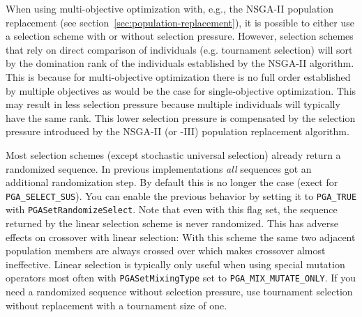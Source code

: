 \documentclass{report}
\begin{document}
When using multi-objective optimization with, e.g., the NSGA-II \cite{DPAM02}
population replacement (see section~\ref{sec:population-replacement}),
it is possible to either use a selection scheme with or without
selection pressure. However, selection schemes that rely on direct
comparison of individuals (e.g. tournament selection) will sort by the
domination rank of the individuals established by the NSGA-II algorithm.
This is because for multi-objective optimization there is no full order
established by multiple objectives as would be the case for
single-objective optimization. This may result in less selection
pressure because multiple individuals will typically have the same rank.
This lower selection pressure is compensated by the selection pressure
introduced by the NSGA-II (or -III) population replacement algorithm.

Most selection schemes (except stochastic universal selection) already
return a randomized sequence. In previous implementations \textit{all}
sequences got an additional randomization step. By default this is no
longer the case (exect for \verb+PGA_SELECT_SUS+). You can enable the
previous behavior by setting it to \verb+PGA_TRUE+ with
\verb+PGASetRandomizeSelect+. Note that even with this flag set, the
sequence returned by the linear selection scheme is never randomized.
This has adverse effects on crossover with linear selection:
With this scheme the same two adjacent population members are always
crossed over which makes crossover almost ineffective.
Linear selection is typically only useful when using special
mutation operators most often with \verb+PGASetMixingType+ set to
\verb+PGA_MIX_MUTATE_ONLY+.
If you need a randomized sequence without selection pressure, use
tournament selection without replacement with a tournament size of one.


% 
\end{document}
